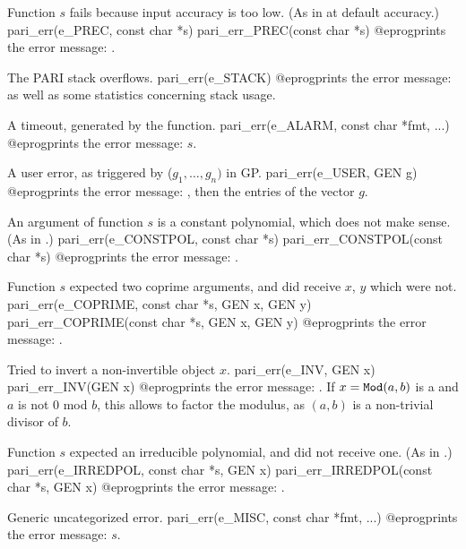 Function $s$ fails because input accuracy is too low.
(As in  at default accuracy.)
\bprog
  pari_err(e_PREC, const char *s)
  pari_err_PREC(const char *s)
@eprog\noindent prints the error message: .

 The PARI stack overflows.
\bprog
  pari_err(e_STACK)
@eprog\noindent prints the error message: 
as well as some statistics concerning stack usage.


 A timeout, generated by the  function.
\bprog
  pari_err(e_ALARM, const char *fmt, ...)
@eprog\noindent prints the error message: $s$.

 A user error, as triggered by ($g_1,\dots,g_n)$
in GP.
\bprog
  pari_err(e_USER, GEN g)
@eprog\noindent prints the error message: , then the
entries of the vector $g$.


 An argument of function $s$ is a constant polynomial,
which does not make sense. (As in .)
\bprog
  pari_err(e_CONSTPOL, const char *s)
  pari_err_CONSTPOL(const char *s)
@eprog\noindent prints the error message: .

 Function $s$ expected two coprime arguments, and did
receive $x$, $y$ which were not.
\bprog
  pari_err(e_COPRIME, const char *s, GEN x, GEN y)
  pari_err_COPRIME(const char *s, GEN x, GEN y)
@eprog\noindent prints the error message: .

 Tried to invert a non-invertible object $x$.
\bprog
  pari_err(e_INV, GEN x)
  pari_err_INV(GEN x)
@eprog\noindent prints the error message: .
If $x = {\tt Mod}(a,b)$ is a  and $a$ is not $0$ mod $b$, this
allows to factor the modulus, as $(a,b)$ is a non-trivial divisor of
$b$.

 Function $s$ expected an irreducible polynomial,
and did not receive one. (As in .)
\bprog
  pari_err(e_IRREDPOL, const char *s, GEN x)
  pari_err_IRREDPOL(const char *s, GEN x)
@eprog\noindent prints the error message: .

 Generic uncategorized error.
\bprog
  pari_err(e_MISC, const char *fmt, ...)
@eprog\noindent prints the error message: $s$.

